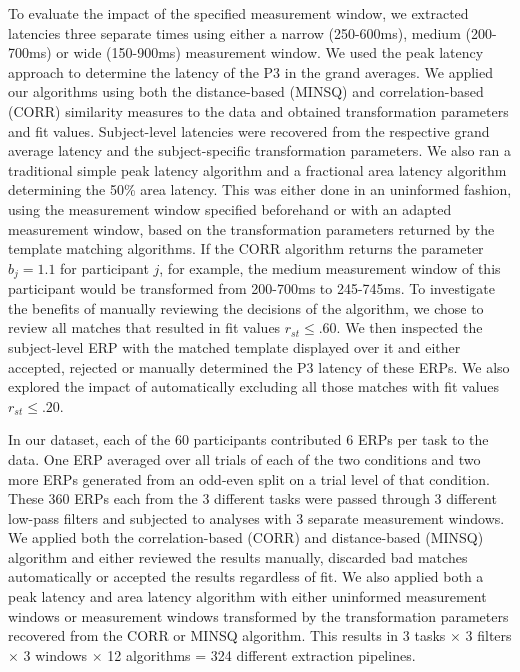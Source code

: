 \documentclass[
  man,floatsintext]{apa7}
\begin{document}
To evaluate the impact of the specified measurement window, we extracted latencies three separate times using either a narrow (250-600ms), medium (200-700ms) or wide (150-900ms) measurement window. We used the peak latency approach to determine the latency of the P3 in the grand averages. We applied our algorithms using both the distance-based (MINSQ) and correlation-based (CORR) similarity measures to the data and obtained transformation parameters and fit values. Subject-level latencies were recovered from the respective grand average latency and the subject-specific transformation parameters.
We also ran a traditional simple peak latency algorithm and a fractional area latency algorithm determining the 50\% area latency. This was either done in an uninformed fashion, using the measurement window specified beforehand or with an adapted measurement window, based on the transformation parameters returned by the template matching algorithms. If the CORR algorithm returns the parameter \(b_j = 1.1\) for participant \(j\), for example, the medium measurement window of this participant would be transformed from 200-700ms to 245-745ms.
To investigate the benefits of manually reviewing the decisions of the algorithm, we chose to review all matches that resulted in fit values \(r_{st} \le .60\). We then inspected the subject-level ERP with the matched template displayed over it and either accepted, rejected or manually determined the P3 latency of these ERPs.
We also explored the impact of automatically excluding all those matches with fit values \(r_{st} \le .20\).

In our dataset, each of the 60 participants contributed 6 ERPs per task to the data. One ERP averaged over all trials of each of the two conditions and two more ERPs generated from an odd-even split on a trial level of that condition. These 360 ERPs each from the 3 different tasks were passed through 3 different low-pass filters and subjected to analyses with 3 separate measurement windows. We applied both the correlation-based (CORR) and distance-based (MINSQ) algorithm and either reviewed the results manually, discarded bad matches automatically or accepted the results regardless of fit. We also applied both a peak latency and area latency algorithm with either uninformed measurement windows or measurement windows transformed by the transformation parameters recovered from the CORR or MINSQ algorithm. This results in 3 tasks \(\times\) 3 filters \(\times\) 3 windows \(\times\) 12 algorithms = 324 different extraction pipelines.
\end{document}
